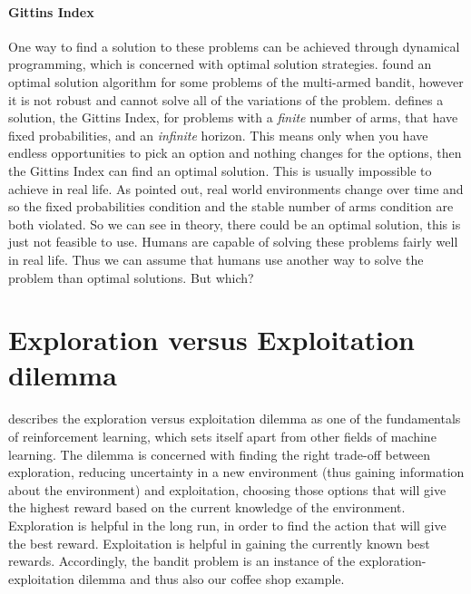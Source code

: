 \paragraph{Gittins Index}
One way to find a solution to these problems can be achieved through dynamical programming, which is concerned with optimal solution strategies.  \cite{gittins1979bandit} found an optimal solution algorithm for some problems of the multi-armed bandit, however it is not robust and cannot solve all of the variations of the problem.
\citeauthor{gittins1979bandit} defines a solution, the Gittins Index, for problems with a \textit{finite} number of arms, that have fixed probabilities, and an \textit{infinite} horizon. This means only when you have endless opportunities to pick an option and nothing changes for the options, then the Gittins Index can find an optimal solution. This is usually impossible to achieve in real life.
As \cite{cohen2007should} pointed out, real world environments change over time and so the fixed probabilities condition and the stable number of arms condition are both violated. 
So we can see in theory, there could be an optimal solution, this is just not feasible to use. Humans are capable of solving these problems fairly well in real life. Thus we can assume that humans use another way to solve the problem than optimal solutions. But which?   

\section{Exploration versus Exploitation dilemma}
\cite{kaelbling1996reinforcement} describes the exploration versus exploitation dilemma as one of the fundamentals of reinforcement learning, which sets itself apart from other fields of machine learning. The dilemma is concerned with finding the right trade-off between exploration, reducing uncertainty in a new environment (thus gaining information about the environment) and exploitation, choosing those options that will give the highest reward based on the current knowledge of the environment. Exploration is helpful in the long run, in order to find the action that will give the best reward. Exploitation is helpful in gaining the currently known best rewards. Accordingly, the bandit problem is an instance of the exploration-exploitation dilemma and thus also our coffee shop example. 


